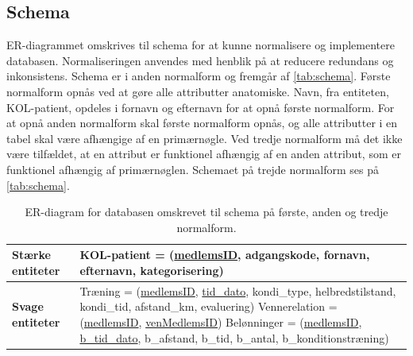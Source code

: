 \subsection{Schema}
ER-diagrammet omskrives til schema for at kunne normalisere og implementere databasen. Normaliseringen anvendes med henblik på at reducere redundans og inkonsistens. Schema er i anden normalform og fremgår af \autoref{tab:schema}. 
Første normalform opnås ved at gøre alle attributter anatomiske. Navn, fra entiteten, KOL-patient, opdeles i fornavn og efternavn for at opnå første normalform. For at opnå anden normalform skal første normalform opnås, og alle attributter i en tabel skal være afhængige af en primærnøgle. Ved tredje normalform må det ikke være tilfældet, at en attribut er funktionel afhængig af en anden attribut, som er funktionel afhængig af primærnøglen. Schemaet på trejde normalform ses på \autoref{tab:schema}.

\begin{table} [H]
	\centering
  \begin{tabular}{ | l | p{12cm} |} \hline
     \textbf{Stærke entiteter} & KOL-patient = (\underline{medlemsID}, adgangskode, fornavn, efternavn, kategorisering) \\ \hline
 	\textbf{Svage entiteter} & Træning = (\underline{medlemsID}, \underline{tid\_dato}, kondi\_type, helbredstilstand, kondi\_tid, afstand_km, evaluering)
 \newline Vennerelation = (\underline{medlemsID}, \underline{venMedlemsID})
\newline Belønninger = (\underline{medlemsID}, \underline{b\_tid\_dato}, b\_afstand, b\_tid, b\_antal, b\_konditionstræning)\\ \hline
    \end{tabular}
    \caption{ER-diagram for databasen omskrevet til schema på første, anden og tredje normalform.}
    \label{tab:schema}
\end{table}

